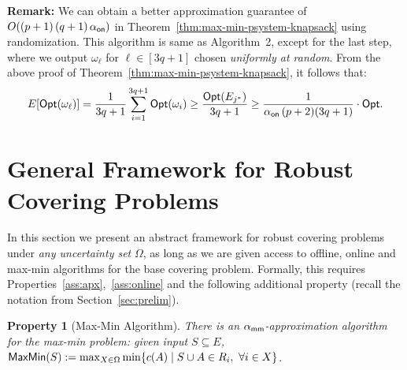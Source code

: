 \documentclass[11pt,letterpaper]{article}
\newtheorem{property}[theorem]{Property}
\def\opt{{\sf Opt}\xspace}
\def\mm{{\sf MaxMin}\xspace}
\newcommand{\sse}{\subseteq}
\newcommand{\online}{\alpha_{\sf on}}
\begin{document}
{\bf Remark:} We can obtain a better approximation guarantee of $O((p+1)\, (q+1)\,\online)$ in
Theorem~\ref{thm:max-min-psystem-knapsack} using randomization. This algorithm is same as Algorithm~2, except for the
last step, where we output $\omega_{\ell}$ for $\ell\in[3q+1]$ chosen {\em uniformly at random}. From the above proof
of Theorem~\ref{thm:max-min-psystem-knapsack}, it follows that:
$$E[\opt(\omega_{\ell})] = \frac1{3q+1} \sum_{i=1}^{3q+1} \opt(\omega_i) \ge \frac{\opt(E_{j^*})}{3q+1}\ge \frac1{\online\,
(p+2)(3q+1)}\cdot \opt.$$

\section{General Framework for Robust Covering Problems} \label{sec:gen-sets}
\newcommand{\mapx}{\alpha_{\sf mm}}

In this section we present an abstract framework for robust covering problems under {\em any uncertainty set} $\Omega$,
as long as we are given access to offline, online and max-min algorithms for the base covering problem. Formally, this
requires Properties~\ref{ass:apx},~\ref{ass:online} and the following additional property (recall the notation from
Section~\ref{sec:prelim}).
\begin{property}[Max-Min Algorithm]\label{ass:maxmin}
  There is an $\mapx$-approximation algorithm for the max-min problem:
  given input $S\sse E$, $\mm(S):= \max_{X\in\Omega} \min \{c(A)\mid S\cup
  A\in R_i,~\forall i\in X\}$.
\end{property}
\end{document}
